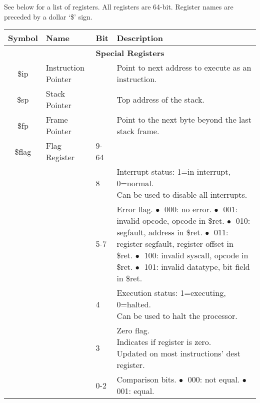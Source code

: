 \documentclass[10pt]{article}
\begin{document}
See below for a list of registers.
All registers are 64-bit.
Register names are preceded by a dollar `\$' sign.

\bigskip
\begin{longtable}{|c|l|l|l|}
    \hline
    \textbf{Symbol} & \textbf{Name} & \textbf{Bit} & \textbf{Description} \\
    \hline
    \multicolumn{4}{|c|}{\textbf{Special Registers}} \\
    \hline
    \$ip & Instruction Pointer &  & Point to next address to execute as an instruction. \\
    \hline
    \$sp & Stack Pointer &  & Top address of the stack. \\
    \hline
    \$fp & Frame Pointer &  & Point to the next byte beyond the last stack frame. \\
    \hline
    \$flag & Flag Register & 9-64 & \\
    \cline{3-4}
    & & 8 & \makecell[l]{Interrupt status: 1=in interrupt, 0=normal.\\%
    Can be used to disable all interrupts.} \\
    \cline{3-4}
    & & 5-7 & \makecell[l]{Error flag.\\%
    \(\bullet\;\) 000: no error.\\%
    \(\bullet\;\) 001: invalid opcode, opcode in \$ret.\\%
    \(\bullet\;\) 010: segfault, address in \$ret.\\%
    \(\bullet\;\) 011: register segfault, register offset in \$ret.\\%
    \(\bullet\;\) 100: invalid syscall, opcode in \$ret.\\%
    \(\bullet\;\) 101: invalid datatype, bit field in \$ret.\\%
    } \\
    \cline{3-4}
    & & 4 & \makecell[l]{Execution status: 1=executing, 0=halted.\\%
    Can be used to halt the processor.} \\
    \cline{3-4}
    & & 3 & \makecell[l]{Zero flag.\\%
    Indicates if register is zero.\\%
    Updated on most instructions' dest register.} \\
    \cline{3-4}
    & & 0-2 & \makecell[l]{Comparison bits.\\%
    \(\bullet\;\) 000: not equal.\\%
    \(\bullet\;\) 001: equal.\\%
}
\end{longtable}
\end{document}

